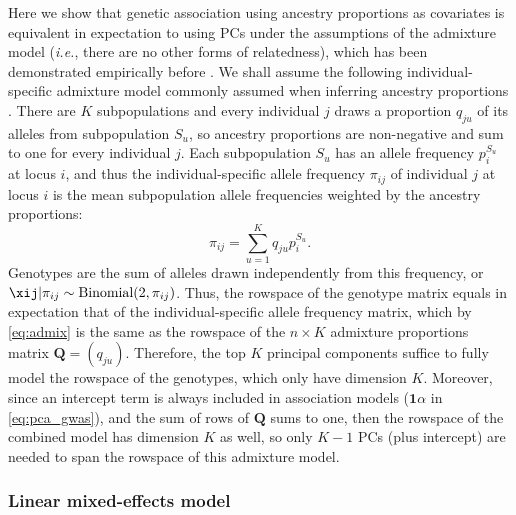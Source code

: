 \documentclass[11pt]{article}
\begin{document}
Here we show that genetic association using ancestry proportions as covariates is equivalent in expectation to using PCs under the assumptions of the admixture model (\textit{i.e.}, there are no other forms of relatedness), which has been demonstrated empirically before \citep{alexander_fast_2009, zhou_strong_2016}.
We shall assume the following individual-specific admixture model commonly assumed when inferring ancestry proportions \citep{pritchard_inference_2000, falush_inference_2003, alexander_fast_2009, gopalan_scaling_2016, cabreros_likelihood-free_2019}.
There are $K$ subpopulations and every individual $j$ draws a proportion $q_{ju}$ of its alleles from subpopulation $S_u$, so ancestry proportions are non-negative and sum to one for every individual $j$.
Each subpopulation $S_u$ has an allele frequency $p_i^{S_u}$ at locus $i$, and thus the individual-specific allele frequency $\pi_{ij}$ of individual $j$ at locus $i$ is the mean subpopulation allele frequencies weighted by the ancestry proportions:
\begin{equation}
  \label{eq:admix}
  \pi_{ij} = \sum_{u=1}^K q_{ju} p_i^{S_u}.
\end{equation}
Genotypes are the sum of alleles drawn independently from this frequency, or $\xij | \pi_{ij} \sim \text{Binomial}(2, \pi_{ij})$.
Thus, the rowspace of the genotype matrix equals in expectation that of the individual-specific allele frequency matrix, which by \cref{eq:admix} is the same as the rowspace of the $n \times K$ admixture proportions matrix $\mathbf{Q} = (q_{ju})$.
Therefore, the top $K$ principal components suffice to fully model the rowspace of the genotypes, which only have dimension $K$.
Moreover, since an intercept term is always included in association models ($\mathbf{1} \alpha$ in \cref{eq:pca_gwas}), and the sum of rows of $\mathbf{Q}$ sums to one, then the rowspace of the combined model has dimension $K$ as well, so only $K-1$ PCs (plus intercept) are needed to span the rowspace of this admixture model.

\subsubsection{Linear mixed-effects model}
\end{document}
